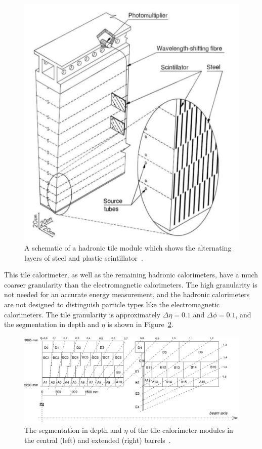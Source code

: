 \begin{figure}[hbtp]
\includegraphics[width=\fullfig]{figures/hadronic_tile.png}
\caption{A schematic of a hadronic tile module which shows the alternating layers of steel and plastic scintillator~\cite{atlas_experiment}.}
\label{fig:hadronic_tile}
\end{figure}

This tile calorimeter, as well as the remaining hadronic calorimeters, have a much coarser granularity than the electromagnetic calorimeters.
The high granularity is not needed for an accurate energy measurement, and the hadronic calorimeters are not designed to distinguish particle types like the electromagnetic calorimeters.
The tile granularity is approximately $\Delta\eta = 0.1$ and $\Delta\phi = 0.1$, and the segmentation in depth and $\eta$ is shown in Figure~\ref{fig:tile_segmentation}.

\begin{figure}[hbtp]
\includegraphics[width=\fullfig]{figures/tile_segmentation.pdf}
\caption{The segmentation in depth and $\eta$ of the tile-calorimeter modules in the central (left) and extended (right) barrels~\cite{atlas_experiment}.}
\label{fig:tile_segmentation}
\end{figure}

